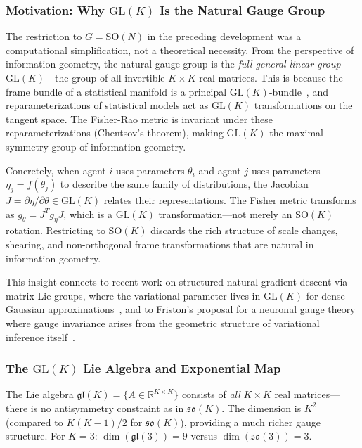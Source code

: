 \documentclass[11pt]{article}
\begin{document}
\subsubsection{Motivation: Why $\mathrm{GL}(K)$ Is the Natural Gauge Group}

The restriction to $G = \mathrm{SO}(N)$ in the preceding development was a computational simplification, not a theoretical necessity. From the perspective of information geometry, the natural gauge group is the \emph{full general linear group} $\mathrm{GL}(K)$---the group of all invertible $K \times K$ real matrices. This is because the frame bundle of a statistical manifold is a principal $\mathrm{GL}(K)$-bundle~\cite{Amari2016}, and reparameterizations of statistical models act as $\mathrm{GL}(K)$ transformations on the tangent space. The Fisher-Rao metric is invariant under these reparameterizations (Chentsov's theorem), making $\mathrm{GL}(K)$ the maximal symmetry group of information geometry.

Concretely, when agent $i$ uses parameters $\theta_i$ and agent $j$ uses parameters $\eta_j = f(\theta_j)$ to describe the same family of distributions, the Jacobian $J = \partial\eta/\partial\theta \in \mathrm{GL}(K)$ relates their representations. The Fisher metric transforms as $g_{\theta} = J^T g_{\eta} J$, which is a $\mathrm{GL}(K)$ transformation---not merely an $\mathrm{SO}(K)$ rotation. Restricting to $\mathrm{SO}(K)$ discards the rich structure of scale changes, shearing, and non-orthogonal frame transformations that are natural in information geometry.

This insight connects to recent work on structured natural gradient descent via matrix Lie groups, where the variational parameter lives in $\mathrm{GL}(K)$ for dense Gaussian approximations~\cite{Lin2021}, and to Friston's proposal for a neuronal gauge theory where gauge invariance arises from the geometric structure of variational inference itself~\cite{Friston2016gauge}.

\subsubsection{The $\mathrm{GL}(K)$ Lie Algebra and Exponential Map}

The Lie algebra $\mathfrak{gl}(K) = \{A \in \mathbb{R}^{K \times K}\}$ consists of \emph{all} $K \times K$ real matrices---there is no antisymmetry constraint as in $\mathfrak{so}(K)$. The dimension is $K^2$ (compared to $K(K-1)/2$ for $\mathfrak{so}(K)$), providing a much richer gauge structure. For $K = 3$: $\dim(\mathfrak{gl}(3)) = 9$ versus $\dim(\mathfrak{so}(3)) = 3$.
\end{document}

